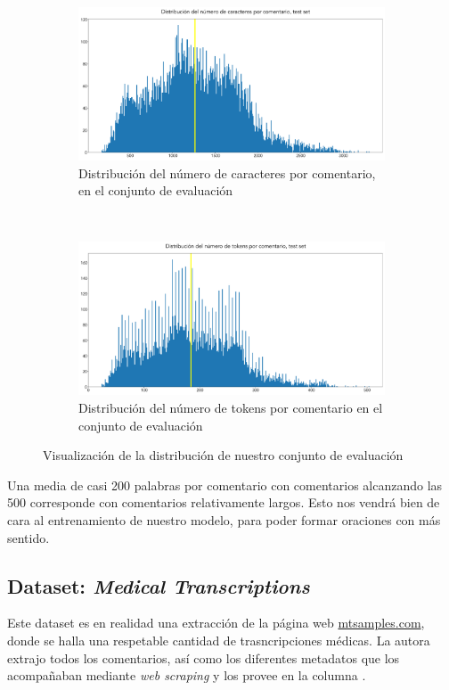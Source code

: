 \begin{figure}[h!]
	\centering
	\begin{subfigure}[t]{0.95\textwidth}
		\centering
		\includegraphics[width=.9\textwidth]{media/char_hist_test.pdf}
		\caption{Distribución del número de caracteres por comentario, en el conjunto de evaluación}
		\label{fig:avg_char_test_test}
	\end{subfigure}

	~

	\begin{subfigure}[t]{0.95\textwidth}
		\centering
		\includegraphics[width=.9\textwidth]{media/tokens_hist_test.pdf}
		\caption{Distribución del número de tokens por comentario en el conjunto de evaluación}
		\label{fig:avg_tokens_test}
	\end{subfigure}


	\caption{Visualización de la distribución de nuestro conjunto de evaluación}
	\label{fig:sum_test}
\end{figure}

Una media de casi 200 palabras por comentario con comentarios alcanzando las 500 corresponde con comentarios relativamente largos. Esto nos vendrá bien de cara al entrenamiento de nuestro modelo, para poder formar oraciones con más sentido.


\subsection{Dataset: \textit{Medical Transcriptions}}
Este dataset es en realidad una extracción de la página web \url{mtsamples.com}, donde se halla una respetable cantidad de trasncripciones médicas. La autora extrajo todos los comentarios, así como los diferentes metadatos que los acompañaban mediante \textit{web scraping} y los provee en la columna .


